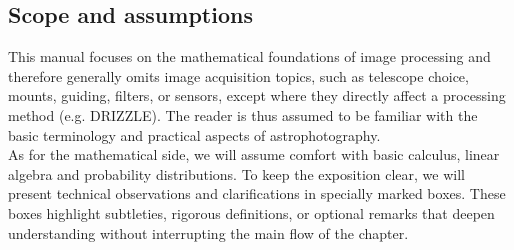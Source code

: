 \subsection{Scope and assumptions}
This manual focuses on the mathematical foundations of image processing and therefore generally omits image acquisition topics, such as telescope choice, mounts, guiding, filters, or sensors, except where they directly affect a processing method (e.g. DRIZZLE).
The reader is thus assumed to be familiar with the basic terminology and practical aspects of astrophotography.
\\[\baselineskip]
As for the mathematical side, we will assume comfort with basic calculus, linear algebra and probability distributions.
To keep the exposition clear, we will present technical observations and clarifications in specially marked boxes.
These boxes highlight subtleties, rigorous definitions, or optional remarks that deepen understanding without interrupting the main flow of the chapter.
